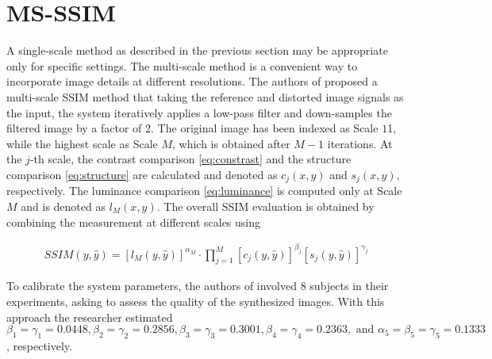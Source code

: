 \section{MS-SSIM}
\label{sec:msssim}
A single-scale method as described in the previous section may be appropriate only for speciﬁc settings. The multi-scale method is a convenient way to incorporate image details at different resolutions. The authors of \cite{wang2003multiscale} proposed a multi-scale SSIM method that taking the reference and distorted image signals as the input, the system iteratively applies a low-pass ﬁlter and down-samples the ﬁltered image by a factor of 2. The original image has been indexed as Scale $1$1, while the highest scale as Scale $M$, which is obtained after $M - 1$ iterations. At the $j$-th scale, the contrast comparison \ref{eq:constrast} and the structure comparison \ref{eq:structure} are calculated and denoted as $c_j (x, y)$ and $s_j (x, y)$, respectively. The luminance comparison \ref{eq:luminance} is computed only at Scale $M$ and is denoted as $l_M (x, y)$. The overall SSIM evaluation is obtained by combining the measurement at different scales using

\begin{align}
SSIM(y, \hat{y}) = [l_M(y, \hat{y})]^{\alpha_M} \cdot \prod^{M}_{j = 1} [c_j(y, \hat{y})]^{\beta_j} [s_j(y, \hat{y})]^{\gamma_j}
\end{align}

To calibrate the system parameters, the authors of \cite{wang2003multiscale} involved 8 subjects in their experiments, asking to assess the quality of the synthesized images. With this approach the researcher estimated $\beta_1 = \gamma_1 = 0.0448, \beta_2 = \gamma_2 = 0.2856, \beta_3 = \gamma_3= 0.3001, \beta_4 = \gamma_4 = 0.2363, \text{ and } \alpha_5 = \beta_5 = \gamma_5 = 0.1333$, respectively.
